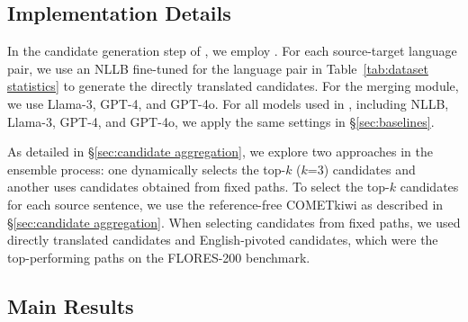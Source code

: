 \subsection{Implementation Details}

In the candidate generation step of \ours, we employ \nllb.
For each source-target language pair, we use an NLLB fine-tuned for the language pair in Table~\ref{tab:dataset statistics} to generate the directly translated candidates.
For the merging module, we use Llama-3, GPT-4, and GPT-4o.
For all models used in \ours, including NLLB, Llama-3, GPT-4, and GPT-4o, we apply the same settings in \S\ref{sec:baselines}.


As detailed in \S\ref{sec:candidate aggregation}, we explore two approaches in the ensemble process: one dynamically selects the top-$\textit{k}$ ($\textit{k}$=3) candidates and another uses candidates obtained from fixed paths.
To select the top-$\textit{k}$ candidates for each source sentence, we use the reference-free COMETkiwi as described in \S\ref{sec:candidate aggregation}.
When selecting candidates from fixed paths, we used directly translated candidates and English-pivoted candidates, which were the top-performing paths on the FLORES-200 benchmark.


\subsection{Main Results}


